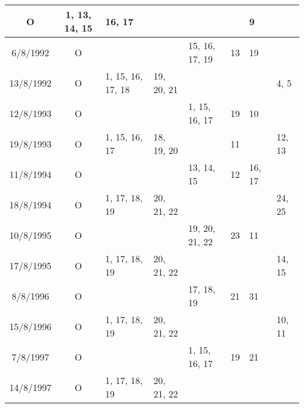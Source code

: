 \begin{longtable}{|c|c|p{1.85cm}|p{1.85cm}|p{1.85cm}|p{1.85cm}|p{1.85cm}|p{1.85cm}|}
	O &
	\raggedright 1, 13, 14, 15 & 
	\raggedright 16, 17 & 
	\raggedright & 
	\raggedright & 
	\raggedright & 
	\raggedright 9
	\tabularnewline
\hline
	6/8/1992	&
	O &
	\raggedright & 
	\raggedright & 
	\raggedright 15, 16, 17, 19 & 
	\raggedright 13 & 
	\raggedright 19 &
	\raggedright 
	\tabularnewline
\hline
	13/8/1992	 &
	O &
	\raggedright 1, 15, 16, 17, 18 & 
	\raggedright 19, 20, 21 & 
	\raggedright & 
	\raggedright & 
	\raggedright & 
	\raggedright 4, 5
	\tabularnewline
\hline
	12/8/1993	 &
	O &
	\raggedright & 
	\raggedright & 
	\raggedright 1, 15, 16, 17 & 
	\raggedright 19 & 
	\raggedright 10 &
	\raggedright 
	\tabularnewline
\hline
	19/8/1993	&
	O &
	\raggedright 1, 15, 16, 17 & 
	\raggedright 18, 19, 20 & 
	\raggedright & 
	\raggedright 11 & 
	\raggedright & 
	\raggedright 12, 13
	\tabularnewline
\hline
	11/8/1994	 &
	O &
	\raggedright & 
	\raggedright & 
	\raggedright 13, 14, 15 & 
	\raggedright 12 & 
	\raggedright 16, 17 &
	\raggedright 
	\tabularnewline
\hline
	18/8/1994	 &
	O &
	\raggedright 1, 17, 18, 19 & 
	\raggedright 20, 21, 22 & 
	\raggedright & 
	\raggedright & 
	\raggedright & 
	\raggedright 24, 25
	\tabularnewline
\hline
	10/8/1995	 &
	O &
	\raggedright & 
	\raggedright & 
	\raggedright 19, 20, 21, 22 & 
	\raggedright 23 & 
	\raggedright 11 &
	\raggedright 
	\tabularnewline
\hline
	17/8/1995	 &
	O &
	\raggedright 1, 17, 18, 19 & 
	\raggedright 20, 21, 22 & 
	\raggedright & 
	\raggedright & 
	\raggedright & 
	\raggedright 14, 15
	\tabularnewline
\hline
	8/8/1996	&
	O &
	\raggedright & 
	\raggedright & 
	\raggedright 17, 18, 19 & 
	\raggedright 21 & 
	\raggedright 31 &
	\raggedright 
	\tabularnewline
\hline
	15/8/1996	 &
	O &
	\raggedright 1, 17, 18, 19 & 
	\raggedright 20, 21, 22 & 
	\raggedright & 
	\raggedright & 
	\raggedright & 
	\raggedright 10, 11
	\tabularnewline
\hline
	7/8/1997	&
	O &
	\raggedright & 
	\raggedright & 
	\raggedright 1, 15, 16, 17 & 
	\raggedright 19 & 
	\raggedright 21 &
	\raggedright 
	\tabularnewline
\hline
	14/8/1997	 &
	O &
	\raggedright 1, 17, 18, 19 & 
	\raggedright 20, 21, 22 & 

\end{longtable}
